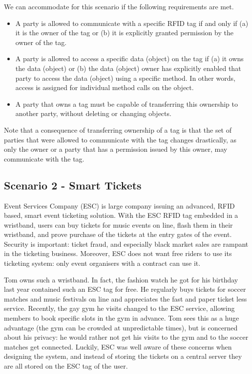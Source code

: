 We can accommodate for this scenario if the following
requirements are met.
\begin{itemize}
\fixlistspacing
\item A party is allowed to
  communicate with a specific RFID tag if and only if (a) 
  it is the owner of the tag or (b) it is explicitly granted permission by the
  owner of the tag.
\item A party is allowed to access a specific data (object) on the tag if
  (a) it owns the data (object) or (b) the data (object) owner has
  explicitly enabled that party to access the data (object) using 
  a specific method. In other words, access is assigned for individual method
  calls on the object.
\item A party that owns a tag must be capable of transferring this ownership to
  another party, without deleting or changing objects.
\end{itemize}
Note that a consequence of transferring ownership of a tag is that the set of parties
that were allowed to communicate with the tag changes drastically, as only the owner
or a party that has a permission issued by this owner, may communicate with the tag.

\subsection{Scenario 2 - Smart Tickets}

Event Services Company (ESC) is large company issuing an advanced, RFID based,
smart event ticketing solution. With the ESC RFID tag embedded in a wristband,
users can buy tickets for music events on line, flash them in their wristband,
and prove purchase of the tickets at the entry gates of the event. Security is
important: ticket fraud, and especially black market sales are rampant in the
ticketing business. Moreover, ESC does not want free riders to use its 
ticketing system: only event organisers with a contract can use it.

Tom owns such a wristband. In fact, the fashion watch he got for his birthday
last year contained such an ESC tag for free. He regularly buys tickets for
soccer matches and music festivals on line and appreciates the fast and paper
ticket less service. Recently, the gay gym he visits changed to the ESC
service, allowing members to book specific slots in the gym in advance. Tom
sees this as a huge advantage (the gym can be crowded at unpredictable times),
but is concerned about his privacy: he would rather not get his visits to the
gym and to the soccer matches get connected. Luckily, ESC was well aware of
these concerns when designing the system, and instead of storing the tickets on
a central server they are all stored on the ESC tag of the user.

